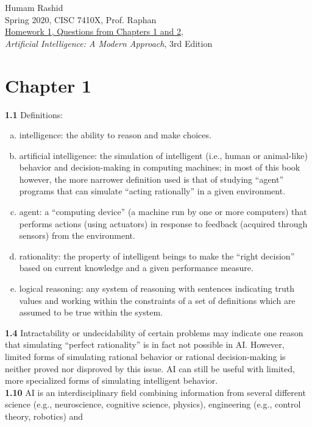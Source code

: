 \documentclass{scrartcl}
\begin{document}
\begin{flushleft}
Humam Rashid\\
Spring 2020, CISC 7410X, Prof. Raphan\\
\underline{Homework 1, Questions from Chapters 1 and 2,}\\
\textit{Artificial Intelligence: A Modern Approach}, 3rd Edition
\end{flushleft}

\section*{Chapter 1}
\textbf{1.1} Definitions:
\begin{enumerate}[(a)]
    \item intelligence: the ability to reason and make choices.
    \item artificial intelligence: the simulation of intelligent (i.e., human or animal-like)
        behavior and decision-making in computing machines; in most of this book however, the more
        narrower definition used is that of studying ``agent'' programs that can simulate
        ``acting rationally'' in a given environment.
    \item agent: a ``computing device'' (a machine run by one or more computers) that performs
        actions (using actuators) in response to feedback (acquired through sensors) from the
        environment.
    \item rationality: the property of intelligent beings to make the ``right decision'' based on
        current knowledge and a given performance measure.
    \item logical reasoning: any system of reasoning with sentences indicating truth values and
        working within the constraints of a set of definitions which are assumed to be true within
        the system.
\end{enumerate}
\textbf{1.4} Intractability or undecidability of certain problems may indicate one reason that
simulating ``perfect rationality'' is in fact not possible in AI. However, limited forms of
simulating rational behavior or rational decision-making is neither proved nor disproved by this
issue. AI can still be useful with limited, more specialized forms of simulating intelligent
behavior.
\bigskip
\\
\textbf{1.10} AI is an interdisciplinary field combining information from several different science
(e.g., neuroscience, cognitive science, physics), engineering (e.g., control theory, robotics) and
\end{document}
